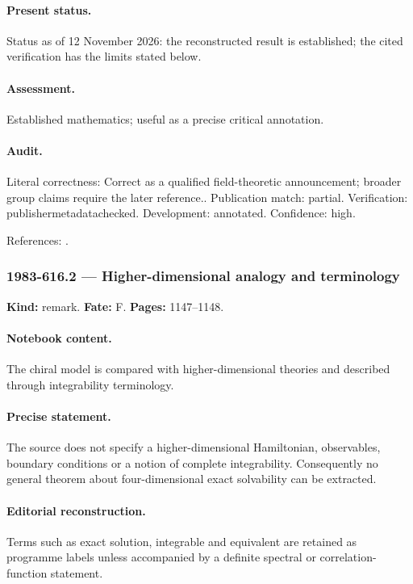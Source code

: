 \paragraph{Present status.} Status as of 12 November 2026: the reconstructed result is established; the cited verification has the limits stated below.

\paragraph{Assessment.} Established mathematics; useful as a precise critical annotation.

\paragraph{Audit.} Literal correctness: Correct as a qualified field-theoretic announcement; broader group claims require the later reference.. Publication match: partial. Verification: publishermetadatachecked. Development: annotated. Confidence: high.

\noindent References: \citep{polyakovwiegmann1983goldstone,wiegmann1984sun}.\par

\subsubsection{1983-616.2 --- Higher-dimensional analogy and terminology}

\label{item:1983-616.2}

\noindent\textbf{Kind:} remark. \textbf{Fate:} F. \textbf{Pages:} 1147--1148.\par

\paragraph{Notebook content.} The chiral model is compared with higher-dimensional theories and described through integrability terminology.

\paragraph{Precise statement.} The source does not specify a higher-dimensional Hamiltonian, observables, boundary conditions or a notion of complete integrability. Consequently no general theorem about four-dimensional exact solvability can be extracted.

\paragraph{Editorial reconstruction.} Terms such as exact solution, integrable and equivalent are retained as programme labels unless accompanied by a definite spectral or correlation-function statement.

